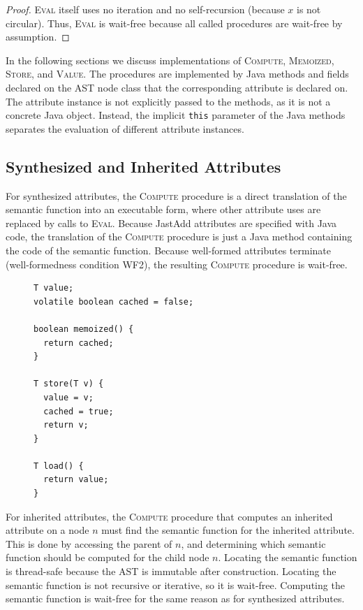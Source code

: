 {\begin{theorem}
  \label{theorem:eval-wait-free}
\end{theorem}

\begin{proof}
  \textsc{Eval} itself uses no iteration and no
  self-recursion (because $x$ is not circular).
  Thus, \textsc{Eval} is wait-free because all called procedures are wait-free by assumption.
\end{proof}

In the following sections we discuss implementations of \textsc{Compute},
\textsc{Memoized}, \textsc{Store}, and \textsc{Value}.
The procedures are implemented by Java methods and fields declared on the AST node class that
the corresponding attribute is declared on.
The attribute instance is not explicitly
passed to the methods, as it is not a concrete Java object.
Instead, the implicit \verb'this' parameter of the Java methods separates the
evaluation of different attribute instances.


\subsection{Synthesized and Inherited Attributes}
\label{syn-compute}

For synthesized attributes, the \textsc{Compute} procedure is a direct translation of
the semantic function into an executable form, where other attribute uses are replaced
by calls to \textsc{Eval}.  Because JastAdd attributes are specified with
Java code, the translation of the \textsc{Compute} procedure is just a Java method containing
the code of the semantic function.
Because well-formed attributes terminate (well-formedness condition WF2),
the resulting \textsc{Compute} procedure is wait-free.


\begin{figure}
\begin{lstlisting}[label={lst:syn-impl},
  caption={Memoization in Java for simple attributes.}]
T value;
volatile boolean cached = false;

boolean memoized() {
  return cached;
}

T store(T v) {
  value = v;
  cached = true;
  return v;
}

T load() {
  return value;
}
\end{lstlisting}
\end{figure}

For inherited attributes, the \textsc{Compute} procedure
that computes an inherited attribute on a node $n$ must
find the semantic function for the inherited attribute.  This is
done by accessing the parent of $n$, and determining which semantic function should
be computed for the child node $n$.
Locating the semantic function is thread-safe because the AST is immutable after construction.
Locating the semantic function is not recursive or iterative, so it is wait-free.
Computing the semantic function is wait-free for the same reason as for synthesized attributes.

}

